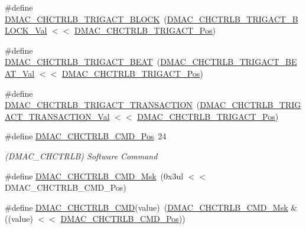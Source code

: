 \begin{DoxyCompactItemize}
\#define \mbox{\hyperlink{group___s_a_m_d21___d_m_a_c_ga6ee6ddba68d195a73a2dfb4010308f03}{D\+M\+A\+C\+\_\+\+C\+H\+C\+T\+R\+L\+B\+\_\+\+T\+R\+I\+G\+A\+C\+T\+\_\+\+B\+L\+O\+CK}}~(\mbox{\hyperlink{group___s_a_m_d21___d_m_a_c_gaa54bf830756309b4ec082836357fc93f}{D\+M\+A\+C\+\_\+\+C\+H\+C\+T\+R\+L\+B\+\_\+\+T\+R\+I\+G\+A\+C\+T\+\_\+\+B\+L\+O\+C\+K\+\_\+\+Val}} $<$$<$ \mbox{\hyperlink{group___s_a_m_d21___d_m_a_c_gaada77814aa3858a4b49aabef88429c31}{D\+M\+A\+C\+\_\+\+C\+H\+C\+T\+R\+L\+B\+\_\+\+T\+R\+I\+G\+A\+C\+T\+\_\+\+Pos}})
\item 
\#define \mbox{\hyperlink{group___s_a_m_d21___d_m_a_c_gaf1130302a7e395b8947651d59967951a}{D\+M\+A\+C\+\_\+\+C\+H\+C\+T\+R\+L\+B\+\_\+\+T\+R\+I\+G\+A\+C\+T\+\_\+\+B\+E\+AT}}~(\mbox{\hyperlink{group___s_a_m_d21___d_m_a_c_ga5ef24f993615ff0560e51bb28f2b630f}{D\+M\+A\+C\+\_\+\+C\+H\+C\+T\+R\+L\+B\+\_\+\+T\+R\+I\+G\+A\+C\+T\+\_\+\+B\+E\+A\+T\+\_\+\+Val}} $<$$<$ \mbox{\hyperlink{group___s_a_m_d21___d_m_a_c_gaada77814aa3858a4b49aabef88429c31}{D\+M\+A\+C\+\_\+\+C\+H\+C\+T\+R\+L\+B\+\_\+\+T\+R\+I\+G\+A\+C\+T\+\_\+\+Pos}})
\item 
\#define \mbox{\hyperlink{group___s_a_m_d21___d_m_a_c_ga9eab478165d067cfd3a570c536204202}{D\+M\+A\+C\+\_\+\+C\+H\+C\+T\+R\+L\+B\+\_\+\+T\+R\+I\+G\+A\+C\+T\+\_\+\+T\+R\+A\+N\+S\+A\+C\+T\+I\+ON}}~(\mbox{\hyperlink{group___s_a_m_d21___d_m_a_c_gab0c773cec6c091dc3bb20e4ccf5699c6}{D\+M\+A\+C\+\_\+\+C\+H\+C\+T\+R\+L\+B\+\_\+\+T\+R\+I\+G\+A\+C\+T\+\_\+\+T\+R\+A\+N\+S\+A\+C\+T\+I\+O\+N\+\_\+\+Val}} $<$$<$ \mbox{\hyperlink{group___s_a_m_d21___d_m_a_c_gaada77814aa3858a4b49aabef88429c31}{D\+M\+A\+C\+\_\+\+C\+H\+C\+T\+R\+L\+B\+\_\+\+T\+R\+I\+G\+A\+C\+T\+\_\+\+Pos}})
\item 
\#define \mbox{\hyperlink{group___s_a_m_d21___d_m_a_c_ga7a6624b9ffc32912d6db81c95a81be97}{D\+M\+A\+C\+\_\+\+C\+H\+C\+T\+R\+L\+B\+\_\+\+C\+M\+D\+\_\+\+Pos}}~24
\begin{DoxyCompactList}\small\item\em (D\+M\+A\+C\+\_\+\+C\+H\+C\+T\+R\+LB) Software Command \end{DoxyCompactList}\item 
\#define \mbox{\hyperlink{group___s_a_m_d21___d_m_a_c_ga088050d1f86599244bb852a465afd63b}{D\+M\+A\+C\+\_\+\+C\+H\+C\+T\+R\+L\+B\+\_\+\+C\+M\+D\+\_\+\+Msk}}~(0x3ul $<$$<$ D\+M\+A\+C\+\_\+\+C\+H\+C\+T\+R\+L\+B\+\_\+\+C\+M\+D\+\_\+\+Pos)
\item 
\#define \mbox{\hyperlink{group___s_a_m_d21___d_m_a_c_gaa1adb82ed7419282796947ae3130af79}{D\+M\+A\+C\+\_\+\+C\+H\+C\+T\+R\+L\+B\+\_\+\+C\+MD}}(value)~(\mbox{\hyperlink{group___s_a_m_d21___d_m_a_c_ga088050d1f86599244bb852a465afd63b}{D\+M\+A\+C\+\_\+\+C\+H\+C\+T\+R\+L\+B\+\_\+\+C\+M\+D\+\_\+\+Msk}} \& ((value) $<$$<$ \mbox{\hyperlink{group___s_a_m_d21___d_m_a_c_ga7a6624b9ffc32912d6db81c95a81be97}{D\+M\+A\+C\+\_\+\+C\+H\+C\+T\+R\+L\+B\+\_\+\+C\+M\+D\+\_\+\+Pos}}))
$$
\end{DoxyCompactItemize}
